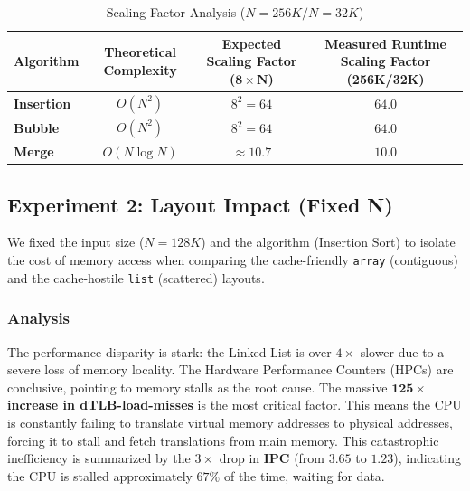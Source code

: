 \documentclass[11pt, a4paper]{article}
\begin{document}
\begin{table}[h]
\centering
\caption{Scaling Factor Analysis ($N=256K / N=32K$)}
\label{tab:scaling_factor}
\begin{tabularx}{\textwidth}{l C C C}
\toprule
\textbf{Algorithm} & \textbf{Theoretical Complexity} & \textbf{Expected Scaling Factor ($\mathbf{8 \times N}$)} & \textbf{Measured Runtime Scaling Factor (256K/32K)} \\
\midrule
\textbf{Insertion} & $O(N^2)$ & $8^2 = 64$ & $\mathbf{64.0}$ \\
\textbf{Bubble} & $O(N^2)$ & $8^2 = 64$ & $\mathbf{64.0}$ \\
\textbf{Merge} & $O(N \log N)$ & $\approx 10.7$ & $\mathbf{10.0}$ \\
\bottomrule
\end{tabularx}
\end{table}


\subsection{Experiment 2: Layout Impact (Fixed N)}
We fixed the input size ($N=128K$) and the algorithm (Insertion Sort) to isolate the cost of memory access when comparing the cache-friendly \texttt{array} (contiguous) and the cache-hostile \texttt{list} (scattered) layouts.

\subsubsection{Analysis}
The performance disparity is stark: the Linked List is over $4\times$ slower due to a severe loss of memory locality. The Hardware Performance Counters (HPCs) are conclusive, pointing to memory stalls as the root cause. The massive \textbf{$\mathbf{125\times}$ increase in dTLB-load-misses} is the most critical factor. This means the CPU is constantly failing to translate virtual memory addresses to physical addresses, forcing it to stall and fetch translations from main memory. This catastrophic inefficiency is summarized by the $3\times$ drop in \textbf{IPC} (from $3.65$ to $1.23$), indicating the CPU is stalled approximately $67\%$ of the time, waiting for data.
\end{document}
